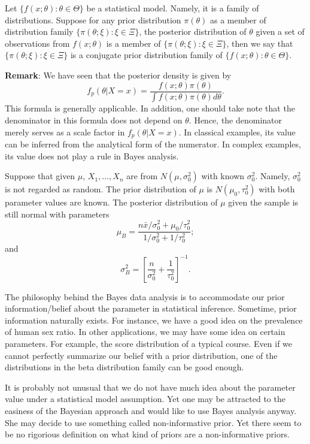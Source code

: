 \begin{defi}
Let $\{f(x; \theta): \theta \in \Theta\}$ be a statistical model. Namely, it is
a family of distributions. Suppose for any prior distribution $\pi(\theta)$
as a member of distribution family $\{\pi(\theta; \xi): \xi \in \Xi\}$,
the posterior distribution of $\theta$ given a set of \iid observations
from $f(x; \theta)$ is a member of $\{\pi(\theta; \xi): \xi \in \Xi\}$,
then we say that $\{\pi(\theta; \xi): \xi \in \Xi\}$ is a conjugate
prior distribution family of $\{f(x; \theta): \theta \in \Theta\}$.
\end{defi}


\vs
\no
{\bf Remark}: We have seen that the posterior density is given by
\[
f_p (\theta | X=x) 
= \frac{f(x; \theta) \pi(\theta)}{\int f(x; \theta) \pi(\theta) d\theta}.
\]
This formula is generally applicable.
In addition, one should take note that the denominator in
this formula does not depend on $\theta$. Hence, the denominator 
merely serves as a scale factor in $f_p (\theta | X=x)$.
In classical examples, its value can be inferred from the analytical
form of the numerator. In complex examples, its value does not
play a rule in Bayes analysis.


\begin{example}
Suppose that given $\mu$, $X_1, \ldots, X_n$ are \iid from 
$N(\mu, \sigma_0^2)$ with known $\sigma_0^2$. Namely, $\sigma_0^2$ is not
regarded as random.
The prior distribution of $\mu$ is $N(\mu_0, \tau_0^2)$ with both parameter
values are known. 
The posterior distribution of $\mu$ given the sample is still normal with
parameters
\[
\mu_B 
= \frac{ n \bar x/\sigma_0^2 + \mu_0 /\tau_0^2}{ 1/\sigma_0^2 + 1 /\tau_0^2};
\]
and
\[
\sigma_B^2 = \left [ \frac{n}{\sigma_0^2} + \frac{1}{\tau_0^2} \right ]^{-1}.
\]
\end{example}

The philosophy behind the Bayes data analysis is to accommodate our
prior information/belief about the parameter in statistical inference. Sometime,
prior information naturally exists. For instance, we have a good idea on the
prevalence of human sex ratio. In other applications, we may have some
idea on certain parameters. For example, the score distribution of a typical
course. Even if we cannot perfectly summarize our belief with a prior distribution,
one of the distributions in the beta distribution family can be good enough.

It is probably not unusual that we do not have much idea about the
parameter value under a statistical model assumption. Yet one may
be attracted to the easiness of the Bayesian approach and would
like to use Bayes analysis anyway. She may decide to use something
called non-informative prior. Yet there seem to be no rigorious definition on
what kind of priors are a non-informative priors.

